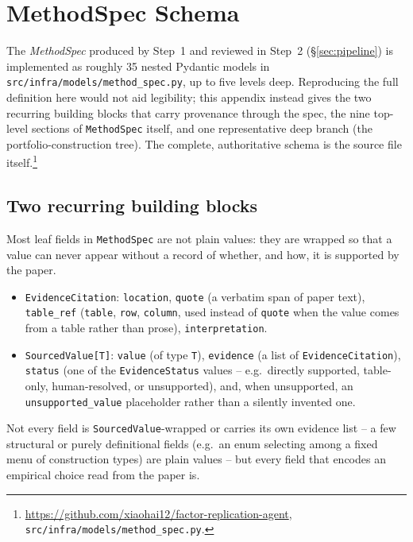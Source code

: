 \section{MethodSpec Schema}
\label{app:methodspec}

The \emph{MethodSpec} produced by Step~1 and reviewed in Step~2
(\S\ref{sec:pipeline}) is implemented as roughly 35 nested Pydantic models in
\texttt{src/infra/models/method\_spec.py}, up to five levels deep. Reproducing
the full definition here would not aid legibility; this appendix instead
gives the two recurring building blocks that carry provenance through the
spec, the nine top-level sections of \texttt{MethodSpec} itself, and one
representative deep branch (the portfolio-construction tree). The complete,
authoritative schema is the source file itself.\footnote{\url{https://github.com/xiaohai12/factor-replication-agent},
\texttt{src/infra/models/method\_spec.py}.}

\subsection{Two recurring building blocks}

Most leaf fields in \texttt{MethodSpec} are not plain values: they are
wrapped so that a value can never appear without a record of whether, and
how, it is supported by the paper.

\begin{itemize}[nosep]
  \item \texttt{EvidenceCitation}: \texttt{location}, \texttt{quote} (a
    verbatim span of paper text), \texttt{table\_ref} (\texttt{table},
    \texttt{row}, \texttt{column}, used instead of \texttt{quote} when the
    value comes from a table rather than prose), \texttt{interpretation}.
  \item \texttt{SourcedValue[T]}: \texttt{value} (of type \texttt{T}),
    \texttt{evidence} (a list of \texttt{EvidenceCitation}), \texttt{status}
    (one of the \texttt{EvidenceStatus} values -- e.g.\ directly supported,
    table-only, human-resolved, or unsupported), and, when unsupported, an
    \texttt{unsupported\_value} placeholder rather than a silently invented
    one.
\end{itemize}

Not every field is \texttt{SourcedValue}-wrapped or carries its own evidence
list -- a few structural or purely definitional fields (e.g.\ an enum
selecting among a fixed menu of construction types) are plain values -- but
every field that encodes an empirical choice read from the paper is.


